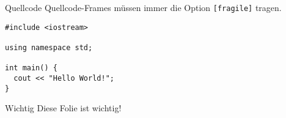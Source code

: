 \documentclass[fleqn,11pt,aspectratio=43]{beamer}
\begin{document}
\begin{frame}[fragile]{Quellcode}
Quellcode-Frames müssen immer die Option \texttt{[fragile]} tragen.
  \begin{verbatim}
#include <iostream>

using namespace std;

int main() {
  cout << "Hello World!";
}
  \end{verbatim}
\end{frame}



\begin{frame}[highlight]{Wichtig}
Diese Folie ist wichtig!
\end{frame}
\end{document}
